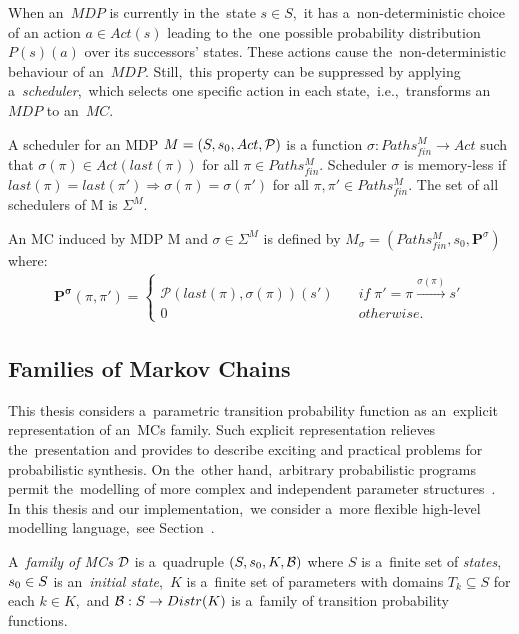 When an~$MDP$ is currently in the~state $s \in S$,~it has a~non-deterministic choice of an action $a \in Act(s)$ leading to the~one possible probability distribution $P(s)(a)$ over its successors' states.
These actions cause the~non-deterministic behaviour of an~$MDP$.
Still,~this property can be suppressed by applying a~\textit{scheduler},~which selects one specific action in each state,~i.e.,~transforms an~$MDP$ to an~$MC$.

\begin{definition}[Scheduler]
\cite{cegar}
A scheduler for an MDP $M = (S,s_{0},Act,\mathcal{P})$ is a function $\sigma: Paths_{fin}^{M} \rightarrow Act$ such that $\sigma(\pi) \in Act(last(\pi))$ for all $\pi \in Paths_{fin}^{M}$.
Scheduler $\sigma$ is memory-less if $last(\pi) = last(\pi') \Longrightarrow \sigma(\pi) = \sigma(\pi')$ for all $\pi, \pi' \in Paths_{fin}^{M}$.
The set of all schedulers of M is $\Sigma^M$.
\end{definition}

\begin{definition}[Induced MC] \label{def:incuded_mc}
\cite{cegar}
An MC induced by MDP M and $\sigma \in \Sigma^M$ is defined by $M_{\sigma} = ( Paths_{fin}^{M}, s_0, \mathbf{P}^{\sigma})$ where:
\begin{align*}
    \mathbf{P^{\sigma}}(\pi, \pi') = 
    \begin{cases}
        \mathcal{P}(last(\pi), \sigma(\pi))(s') \quad & if \; \pi' = \pi \overset{\sigma(\pi)}{\rightarrow} s' \\
         0 \quad & otherwise.
    \end{cases}
\end{align*}
\end{definition}

\subsection{Families of Markov Chains}
This thesis considers a~parametric transition probability function as an~explicit representation of an~MCs family.
Such explicit representation relieves the~presentation and provides to describe exciting and practical problems for probabilistic synthesis.
On the~other hand,~arbitrary probabilistic programs permit the~modelling of more complex and independent parameter structures~\cite{cegar}.
In this thesis and our implementation,~we consider a~more flexible high-level modelling language,~see Section~.

\begin{definition}
\cite{cegar}
    A~\emph{family of MCs} $\mathcal{D}$ is a~quadruple $(S,s_{0},K,\mathcal{B})$  where $S$ is a~finite set of \emph{states}, $s_{0} \in S$ is an~\emph{initial state},~$K$ is a~finite set of parameters with domains $T_k \subseteq S$ for each $k \in K$,~and $\mathcal{B} : S \rightarrow Distr(K)$ is a~family of transition probability functions.
\end{definition}

